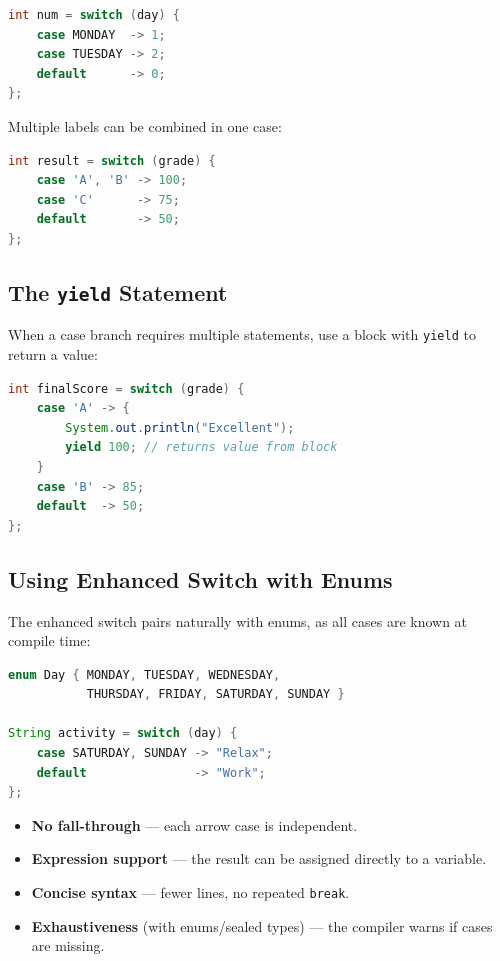 \documentclass[11pt, a4paper, notitlepage]{report}
\theoremstyle{definition}
\theoremstyle{remark}
\theoremstyle{definition}
\begin{document}
\begin{lstlisting}[language=Java]
int num = switch (day) {
    case MONDAY  -> 1;
    case TUESDAY -> 2;
    default      -> 0;
};
\end{lstlisting}

Multiple labels can be combined in one case:

\begin{lstlisting}[language=Java]
int result = switch (grade) {
    case 'A', 'B' -> 100;
    case 'C'      -> 75;
    default       -> 50;
};
\end{lstlisting}

\subsection{The \texttt{yield} Statement}
\label{subsec:ch10-yield}

When a case branch requires multiple statements, use a block with \texttt{yield} to
return a value:

\begin{lstlisting}[language=Java]
int finalScore = switch (grade) {
    case 'A' -> {
        System.out.println("Excellent");
        yield 100; // returns value from block
    }
    case 'B' -> 85;
    default  -> 50;
};
\end{lstlisting}

\subsection{Using Enhanced Switch with Enums}
\label{subsec:ch10-switch-enum}

The enhanced switch pairs naturally with enums, as all cases are known at compile time:

\begin{lstlisting}[language=Java]
enum Day { MONDAY, TUESDAY, WEDNESDAY,
           THURSDAY, FRIDAY, SATURDAY, SUNDAY }

String activity = switch (day) {
    case SATURDAY, SUNDAY -> "Relax";
    default               -> "Work";
};
\end{lstlisting}

\begin{keyresult}[title={Key Result: Enhanced Switch Benefits}]
\begin{itemize}[nosep]
  \item \textbf{No fall-through} --- each arrow case is independent.
  \item \textbf{Expression support} --- the result can be assigned directly to a
        variable.
  \item \textbf{Concise syntax} --- fewer lines, no repeated \texttt{break}.
  \item \textbf{Exhaustiveness} (with enums/sealed types) --- the compiler warns if
        cases are missing.
\end{itemize}
\end{keyresult}
\end{document}
